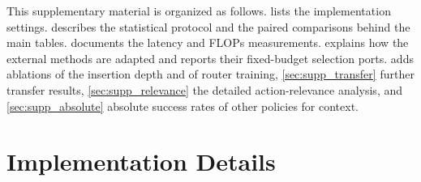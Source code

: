 \clearpage
\setcounter{page}{1}
\maketitlesupplementary

\setcounter{section}{0}
\renewcommand{\thesection}{\Alph{section}}
\renewcommand{\theHsection}{supp.\arabic{section}}
\setcounter{table}{0}
\renewcommand{\thetable}{S\arabic{table}}
\renewcommand{\theHtable}{supp.\arabic{table}}
\setcounter{figure}{0}
\renewcommand{\thefigure}{S\arabic{figure}}
\renewcommand{\theHfigure}{supp.\arabic{figure}}

\ifdefined\supponly
  \DeclareRobustCommand{\mainref}[2]{#2 of the main paper}
\else
  \DeclareRobustCommand{\mainref}[2]{\cref{#1}}
\fi

\raggedbottom

This supplementary material is organized as follows.
 lists the implementation settings.
 describes the statistical protocol and the paired comparisons behind the main tables.
 documents the latency and FLOPs measurements.
 explains how the external methods are adapted and reports their fixed-budget selection ports.
 adds ablations of the insertion depth and of router training, \cref{sec:supp_transfer} further transfer results, \cref{sec:supp_relevance} the detailed action-relevance analysis, and \cref{sec:supp_absolute} absolute success rates of other policies for context.

\section{Implementation Details}
\label{sec:supp_impl}

